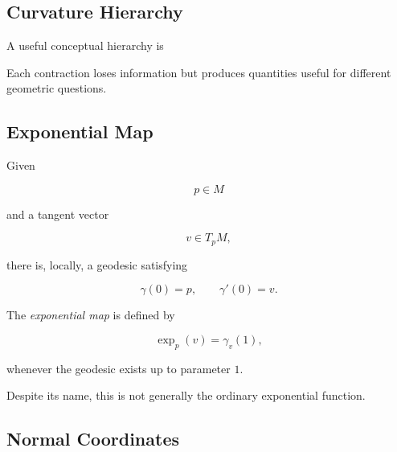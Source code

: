 \subsection{Curvature Hierarchy}
\label{subsec:curvature-hierarchy}

A useful conceptual hierarchy is

\begin{centereddiagram}
\end{centereddiagram}

Each contraction loses information but produces quantities useful for
different geometric questions.

\subsection{Exponential Map}
\label{subsec:exponential-map}

Given

\[
p\in M
\]

and a tangent vector

\[
v\in T_pM,
\]

there is, locally, a geodesic satisfying

\[
\gamma(0)=p,
\qquad
\gamma'(0)=v.
\]

The \emph{exponential map} is defined by

\[
\boxed{
\exp_p(v)=\gamma_v(1),
}
\]

whenever the geodesic exists up to parameter \(1\).

Despite its name, this is not generally the ordinary exponential function.

\subsection{Normal Coordinates}
\label{subsec:normal-coordinates}

